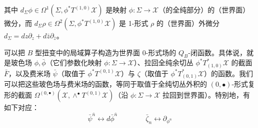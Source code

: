 其中 $d_\Sigma\phi\in\Omega^1(\Sigma,\phi^*T^{(1,0)}\mathcal{X})$ 是映射 $\phi:\Sigma\to\mathcal{X}$（的全纯部分）的（世界面）微分，而 $d_\Sigma\rho\in\Omega^2(\Sigma,\phi^*T^{(1,0)}\mathcal{X})$ 是 1-形式 $\rho$ 的（世界面）外微分 $d_\Sigma=dz\partial_z+d\bar z\partial_{\bar z}$。

可以把 $B$ 型扭变中的局域算子构造为世界面 0-形式场的 $Q_B$-闭函数。具体说，就是玻色场 $\phi,\bar\phi$（它们参数化映射 $\phi:\Sigma\to\mathcal{X}$）、拉回全纯余切丛 $\phi^*T^*_{(1,0)}\mathcal{X}$ 的截面 $\bar F$，以及费米场 $\bar\psi$（取值于 $\phi^*T^{(0,1)}\mathcal{X}$）与 $\zeta$（取值于 $\phi^*T^*_{(0,1)}\mathcal{X}$）的函数。我们可以把这些玻色场与费米场的函数，等同于取值于全纯切丛外积的 $(0,\bullet)$-形式复形的截面 $\Omega^{(0,\bullet)}(\mathcal{X},\wedge^\bullet T^{(0,1)}\mathcal{X})$（沿 $\phi:\Sigma\to\mathcal{X}$ 拉回到世界面）。特别地，有如下对应：
\begin{equation}\tag{2.31}
\bar\psi^{\bar n}\leftrightarrow d\bar\phi^{\bar n}\qquad\qquad \bar\zeta_n\leftrightarrow\partial_{\phi^n}
\end{equation}

